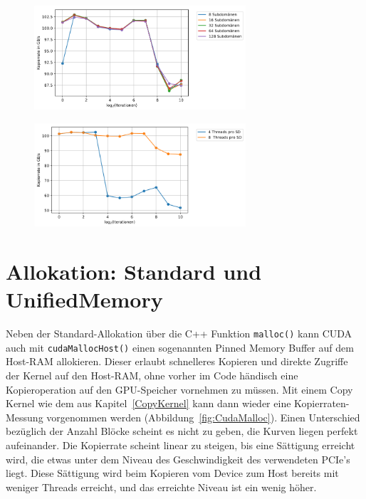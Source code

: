 \documentclass[11pt, abstract=on]{scrartcl}
\begin{document}
\begin{figure} [htbp]
 	\centering
 		\includegraphics[width=0.7\textwidth]{Graph_OffsetAccessSDpBlock3.png}
 	\caption{}
 	\label{fig:OffsetSD2}
\end{figure}

\begin{figure} [htbp]
 	\centering
 		\includegraphics[width=0.7\textwidth]{Graph_OffsetAccessSDpBlock4.png}
 	\caption{}
 	\label{fig:OffsetSD3}
\end{figure}

\section{Allokation: Standard und UnifiedMemory}
Neben der Standard-Allokation über die C++ Funktion \texttt{malloc()} kann CUDA auch mit \texttt{cudaMallocHost()} einen sogenannten Pinned Memory Buffer auf dem Host-RAM allokieren. Dieser erlaubt schnelleres Kopieren und direkte Zugriffe der Kernel auf den Host-RAM, ohne vorher im Code händisch eine Kopieroperation auf den GPU-Speicher vornehmen zu müssen. Mit einem Copy Kernel wie dem aus Kapitel~\ref{CopyKernel} kann dann wieder eine Kopierraten-Messung vorgenommen werden (Abbildung~\ref{fig:CudaMalloc}). Einen Unterschied bezüglich der Anzahl Blöcke scheint es nicht zu geben, die Kurven liegen perfekt aufeinander. Die Kopierrate scheint linear zu steigen, bis eine Sättigung erreicht wird, die etwas unter dem Niveau des Geschwindigkeit des verwendeten PCIe's liegt. Diese Sättigung wird beim Kopieren vom Device zum Host bereits mit weniger Threads erreicht, und das erreichte Niveau ist ein wenig höher. 
\end{document}

